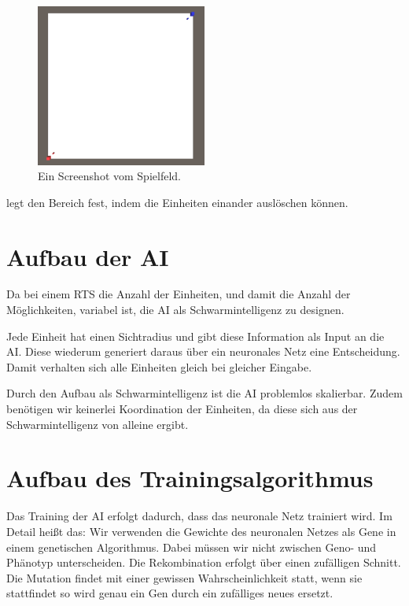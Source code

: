 \documentclass[
	12pt,
	a4paper,
	BCOR10mm,
	DIV14,
	headsepline,
	usegeometry,
]{scrreprt}
\begin{document}
\begin{figure}[h]
	\centering
	\includegraphics[width = 0.5\textwidth]{Spielfeld.png}
	\caption{Ein Screenshot vom Spielfeld.}
	\label{Spielfeld}
\end{figure} 


 legt den Bereich fest, indem die Einheiten einander auslöschen können.


\section{Aufbau der AI}
Da bei einem RTS die Anzahl der Einheiten, und damit die Anzahl der Möglichkeiten, variabel ist,  die AI als Schwarmintelligenz zu designen.

Jede Einheit hat einen Sichtradius und gibt diese Information als Input an die AI. 
Diese wiederum generiert daraus über ein neuronales Netz eine Entscheidung. 
Damit verhalten sich alle Einheiten gleich bei gleicher Eingabe. 

Durch den Aufbau als Schwarmintelligenz ist die AI problemlos skalierbar. 
Zudem benötigen wir keinerlei Koordination der Einheiten, da diese sich aus der Schwarmintelligenz von alleine ergibt.

\section{Aufbau des Trainingsalgorithmus}
Das Training der AI erfolgt dadurch, dass das neuronale Netz trainiert wird.
Im Detail heißt das: Wir verwenden die Gewichte des neuronalen Netzes als Gene in einem genetischen Algorithmus.
Dabei müssen wir nicht zwischen Geno- und Phänotyp unterscheiden.
Die Rekombination erfolgt über einen zufälligen Schnitt.
Die Mutation findet mit einer gewissen Wahrscheinlichkeit statt, wenn sie stattfindet so wird genau ein Gen durch ein zufälliges neues ersetzt.
\end{document}

